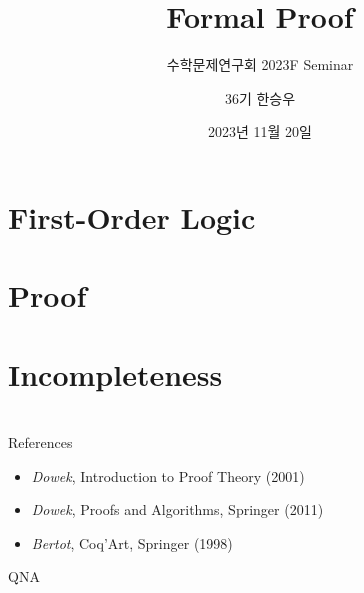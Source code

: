 \documentclass[handout]{beamer}
\title{Formal Proof}
\subtitle{수학문제연구회 2023F Seminar}
\author{36기 한승우}
\institute{KAIST 수학문제연구회}
\date{2023년 11월 20일}
\newcommand{\ii}{\item}
\begin{document}
\begin{frame}
    \titlepage
\end{frame}



\section{First-Order Logic}


\section{Proof}


\section{Incompleteness}


\section*{}
\begin{frame}{References}
    \begin{itemize}
        \ii \textit{Dowek}, Introduction to Proof Theory (2001)
        \ii \textit{Dowek}, Proofs and Algorithms, Springer (2011)
        \ii \textit{Bertot}, Coq'Art, Springer (1998)
    \end{itemize}
\end{frame}
\begin{frame}{QNA}
    \begin{center}
    \end{center}
\end{frame}
\end{document}
